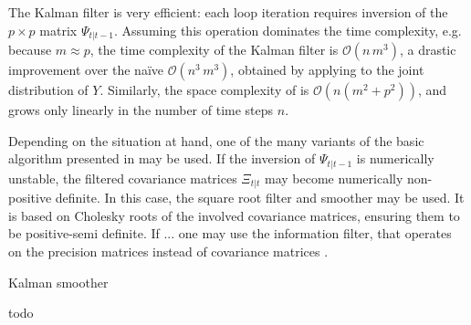The Kalman filter is very efficient: each loop iteration requires inversion of the $p \times p$ matrix $\Psi_{t | t - 1}$. Assuming this operation dominates the time complexity, e.g. because $m \approx p$, the time complexity of the Kalman filter is $\mathcal O(n\,m^{3})$, a drastic improvement over the naïve $\mathcal O(n^{3}\,m^{3})$, obtained by applying  to the joint distribution of $Y$. Similarly, the space complexity of  is $\mathcal O \left( n \left( m^{2} + p^{2} \right) \right)$, and grows only linearly in the number of time steps $n$.

Depending on the situation at hand, one of the many variants of the basic algorithm presented in  may be used. If the inversion of $\Psi_{t|t-1}$ is numerically unstable, the filtered covariance matrices $\Xi_{t|t}$ may become numerically non-positive definite. In this case, the square root filter and smoother \cite{Morf1975Squareroot} may be used. It is based on Cholesky roots of the involved covariance matrices, ensuring them to be positive-semi definite. 
If ... one may use the information filter, that operates on the precision matrices instead of covariance matrices .
\begin{algorithm}
    \caption{Kalman smoother}
    \label{alg:kalman_smoother}
    \begin{algorithmic}
        \Require todo
    \end{algorithmic}
\end{algorithm}



